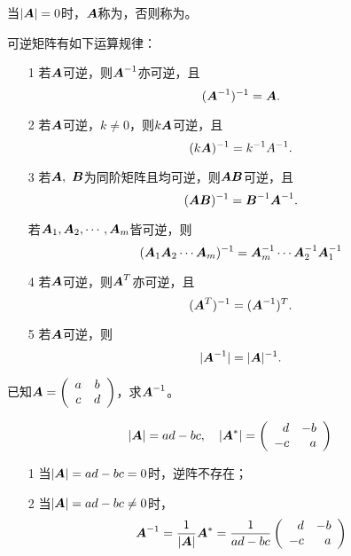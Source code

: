 
\begin{dingyi}[奇异阵与非奇异阵]
  当$|\boldsymbol{A}|=0$时，$\boldsymbol{A}$称为，否则称为。
\end{dingyi}


\begin{zhu}
\end{zhu}


\begin{dingli}可逆矩阵有如下运算规律：
  \begin{enumerate}
  \item[1] 若$\boldsymbol{A}$可逆，则$\boldsymbol{A}^{-1}$亦可逆，且
    $$(\boldsymbol{A}^{-1})^{-1}=\boldsymbol{A}.$$
  \item[2] 若$\boldsymbol{A}$可逆，$k\ne 0$，则$k\boldsymbol{A}$可逆，且
    $$(k\boldsymbol{A})^{-1}= k^{-1}A^{-1}.$$
  \item[3] 若$\boldsymbol{A}, ~\boldsymbol{B}$为同阶矩阵且均可逆，则$\boldsymbol{A}\boldsymbol{B}$可逆，且
    $$(\boldsymbol{A}\boldsymbol{B})^{-1} = \boldsymbol{B}^{-1}\boldsymbol{A}^{-1}.$$
  \item[] 若$\boldsymbol{A}_1,\boldsymbol{A}_2,\cdots,\boldsymbol{A}_m$皆可逆，则
    $$
    (\boldsymbol{A}_1\boldsymbol{A}_2\cdots\boldsymbol{A}_m)^{-1}=\boldsymbol{A}_m^{-1}\cdots\boldsymbol{A}_2^{-1}\boldsymbol{A}_1^{-1}
    $$
  \item[4] 若$\boldsymbol{A}$可逆，则$\boldsymbol{A}^T$亦可逆，且
    $$(\boldsymbol{A}^T)^{-1}=(\boldsymbol{A}^{-1})^T.$$ 
  \item[5] 若$\boldsymbol{A}$可逆，则
    $$|\boldsymbol{A}^{-1}|=|\boldsymbol{A}|^{-1}.$$
  \end{enumerate}
\end{dingli}


\begin{li}
  已知$\boldsymbol{A} = \left(
    \begin{array}{cc}
      a & b \\
      c & d
    \end{array}
  \right)$，求$\boldsymbol{A}^{-1}$。
\end{li}
\begin{jie}

$$
|\boldsymbol{A}| = ad-bc, \quad
|\boldsymbol{A}^*| = \left(
  \begin{array}{rr}
    d & -b \\
    -c & a
  \end{array}
\right)
$$

\begin{itemize}
\item[1] 当$|\boldsymbol{A}|=ad-bc=0$时，逆阵不存在； 
\item[2] 当$|\boldsymbol{A}|=ad-bc\ne0$时，
  $$
  \boldsymbol{A}^{-1} = \frac1{|\boldsymbol{A}|} \boldsymbol{A}^* = \frac1{ad-bc}\left(
    \begin{array}{rr}
      d & -b \\
      -c & a
    \end{array}
  \right)
  $$
\end{itemize}
\end{jie}

